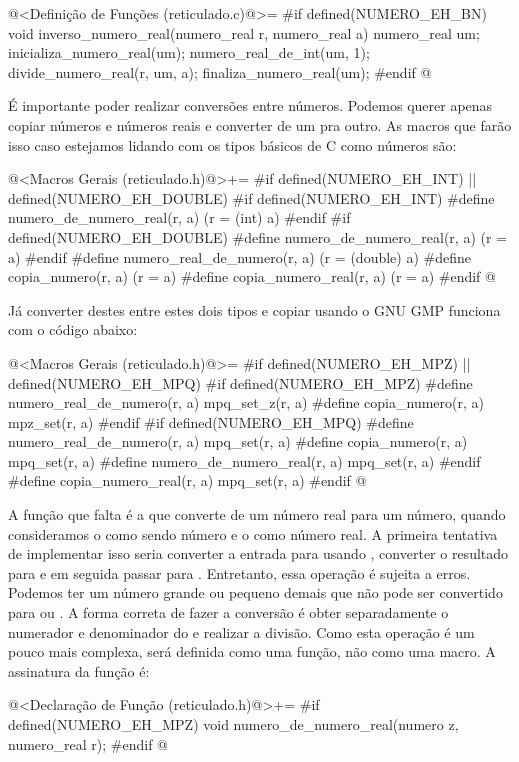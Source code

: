 \iniciocodigo
@<Definição de Funções (reticulado.c)@>=
#if defined(NUMERO_EH_BN)
void inverso_numero_real(numero_real r, numero_real a){
  numero_real um;
  inicializa_numero_real(um);
  numero_real_de_int(um, 1);
  divide_numero_real(r, um, a);
  finaliza_numero_real(um);
}
#endif
@
\fimcodigo

É importante poder realizar conversões entre números. Podemos querer
apenas copiar números e números reais e converter de um pra outro. As
macros que farão isso caso estejamos lidando com os tipos básicos de C
como números são:

\iniciocodigo
@<Macros Gerais (reticulado.h)@>+=
#if defined(NUMERO_EH_INT) || defined(NUMERO_EH_DOUBLE)
#if defined(NUMERO_EH_INT)
#define numero_de_numero_real(r, a) (r = (int) a)
#endif
#if defined(NUMERO_EH_DOUBLE)
#define numero_de_numero_real(r, a) (r = a)
#endif
#define numero_real_de_numero(r, a) (r = (double) a)
#define copia_numero(r, a) (r = a)
#define copia_numero_real(r, a) (r = a)
#endif
@
\fimcodigo

Já converter destes entre estes dois tipos e copiar usando o GNU GMP
funciona com o código abaixo:

\iniciocodigo
@<Macros Gerais (reticulado.h)@>=
#if defined(NUMERO_EH_MPZ) || defined(NUMERO_EH_MPQ)
#if defined(NUMERO_EH_MPZ)
#define numero_real_de_numero(r, a) mpq_set_z(r, a)
#define copia_numero(r, a) mpz_set(r, a)
#endif
#if defined(NUMERO_EH_MPQ)
#define numero_real_de_numero(r, a) mpq_set(r, a)
#define copia_numero(r, a) mpq_set(r, a)
#define numero_de_numero_real(r, a) mpq_set(r, a)
#endif
#define copia_numero_real(r, a) mpq_set(r, a)
#endif
@
\fimcodigo

A função que falta é a que converte de um número real para um número,
quando consideramos o  como sendo número e
o  como número real. A primeira tentativa de
implementar isso seria converter a entrada para 
usando , converter o resultado
para  e em seguida passar
para . Entretanto, essa operação é sujeita a
erros. Podemos ter um número grande ou pequeno demais que não pode ser
convertido para  ou . A
forma correta de fazer a conversão é obter separadamente o numerador e
denominador do  e realizar a divisão. Como esta
operação é um pouco mais complexa, será definida como uma função, não
como uma macro. A assinatura da função é:

\iniciocodigo
@<Declaração de Função (reticulado.h)@>+=
#if defined(NUMERO_EH_MPZ)
void numero_de_numero_real(numero z, numero_real r);
#endif
@
\fimcodigo

